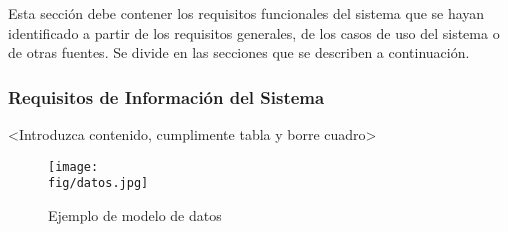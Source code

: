 \begin{textoazul}
Esta sección debe contener los requisitos funcionales del sistema que se hayan identificado a partir de los requisitos generales, de los casos de uso del sistema o de otras fuentes. Se divide en las secciones que se describen a continuación.
\end{textoazul}
  

            
\subsubsection{Requisitos de Información del Sistema}
<Introduzca contenido, cumplimente tabla y borre cuadro>
 
 
   \begin{figure}[H]
 \centering
\texttt{[image: \\fig/datos.jpg]}
 \caption{Ejemplo de modelo de datos}
 \end{figure}
 



